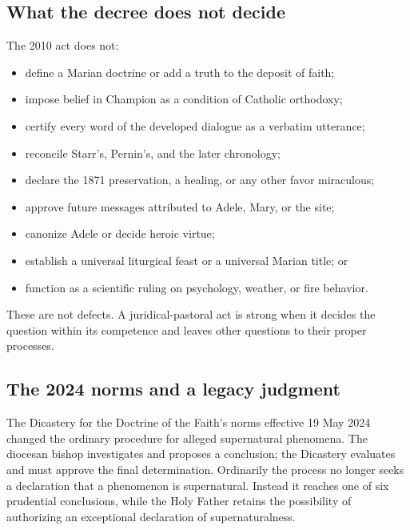 \subsection{What the decree does not decide}

The 2010 act does not:

\begin{itemize}
  \item define a Marian doctrine or add a truth to the deposit of faith;
  \item impose belief in Champion as a condition of Catholic orthodoxy;
  \item certify every word of the developed dialogue as a verbatim utterance;
  \item reconcile Starr's, Pernin's, and the later chronology;
  \item declare the 1871 preservation, a healing, or any other favor miraculous;
  \item approve future messages attributed to Adele, Mary, or the site;
  \item canonize Adele or decide heroic virtue;
  \item establish a universal liturgical feast or a universal Marian title; or
  \item function as a scientific ruling on psychology, weather, or fire behavior.
\end{itemize}

These are not defects. A juridical-pastoral act is strong when it decides the question within its competence and leaves other questions to their proper processes.

\subsection{The 2024 norms and a legacy judgment}

The Dicastery for the Doctrine of the Faith's norms effective 19 May 2024 changed the ordinary procedure for alleged supernatural phenomena. The diocesan bishop investigates and proposes a conclusion; the Dicastery evaluates and must approve the final determination. Ordinarily the process no longer seeks a declaration that a phenomenon is supernatural. Instead it reaches one of six prudential conclusions, while the Holy Father retains the possibility of authorizing an exceptional declaration of supernaturalness.

